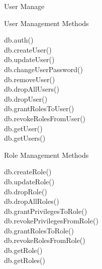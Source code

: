 \documentclass{beamer}
\begin{document}
\begin{frame}{User Manage}
	\begin{minipage}[t]{0.48\textwidth}
		\begin{block}{User Management Methods}
			\scriptsize
			\begin{Alms*}
				db.auth() \\
				db.createUser()	\\
				db.updateUser()	\\
				db.changeUserPassword()	\\
				db.removeUser()	\\
				db.dropAllUsers() \\
				db.dropUser() \\
				db.grantRolesToUser() \\
				db.revokeRolesFromUser() \\
				db.getUser() \\
				db.getUsers() \\
			\end{Alms*}
		\end{block}
	\end{minipage}
	\hfill
	\begin{minipage}[t]{0.48\textwidth}
		\begin{block}{Role Management Methods}
			\scriptsize
			\begin{Alms*}
				db.createRole()	\\
				db.updateRole()	\\
				db.dropRole() \\
				db.dropAllRoles() \\
				db.grantPrivilegesToRole()	\\
				db.revokePrivilegesFromRole() \\
				db.grantRolesToRole() \\
				db.revokeRolesFromRole() \\
				db.getRole() \\
				db.getRoles() \\
			\end{Alms*}
		\end{block}
	\end{minipage}
\end{frame}
\end{document}
